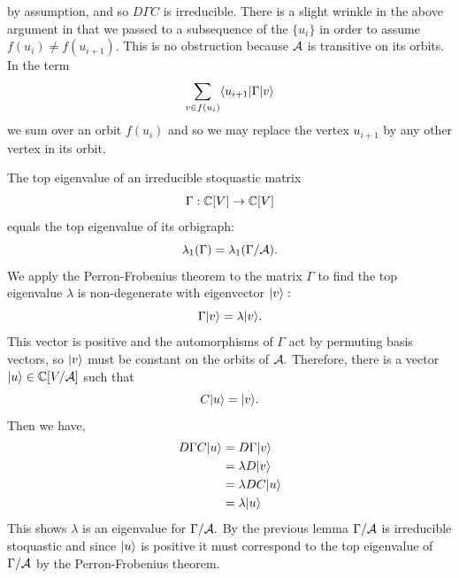 by assumption,
and so $D\Gamma C$ is irreducible.
There is a slight wrinkle in the above argument in that we passed
to a subsequence of the $\{u_i\}$ in order to assume $f(u_i)\ne f(u_{i+1}).$ 
This is no obstruction because $\mathcal{A}$ is transitive on its orbits.
In the term 
$$
        \sum_{v\in f(u_i)} \langle{u_{i+1}}| \Gamma |{v}\rangle
$$
we sum over an orbit $f(u_i)$ and so 
we may replace the vertex $u_{i+1}$ by any other vertex in its orbit.
\tombstone

The top eigenvalue of 
an irreducible stoquastic matrix 
$$\Gamma:\mathbb{C}[V]\to\mathbb{C}[V]$$
equals the top eigenvalue of its orbigraph:
$$
    \lambda_1(\Gamma) = \lambda_1(\Gamma/\mathcal{A}).
$$
\doproof
We apply the Perron-Frobenius theorem to the matrix
$\Gamma$ to find the top eigenvalue $\lambda$ is non-degenerate
with eigenvector $|{v}\rangle:$
$$
    \Gamma|{v}\rangle = \lambda |{v}\rangle.
$$
This vector is positive and the automorphisms of $\Gamma$
act by permuting basis vectors, so $|{v}\rangle$ must be constant on
the orbits of $\mathcal{A}.$
Therefore, there is a vector $|{u}\rangle\in\mathbb{C}[V/\mathcal{A}]$ such that
$$
    C|{u}\rangle = |{v}\rangle.
$$
Then we have,
\begin{align*}
    D\Gamma C|{u}\rangle 
    &= D\Gamma|{v}\rangle \\
    &= \lambda D|{v}\rangle \\
    &= \lambda DC|{u}\rangle \\
    &= \lambda |{u}\rangle
\end{align*}
This shows $\lambda$ is an eigenvalue for $\Gamma/\mathcal{A}.$
By the previous lemma $\Gamma/\mathcal{A}$ is irreducible
stoquastic and since $|{u}\rangle$ is positive it must correspond to the
top eigenvalue of $\Gamma/\mathcal{A}$ by the Perron-Frobenius theorem.
\tombstone



